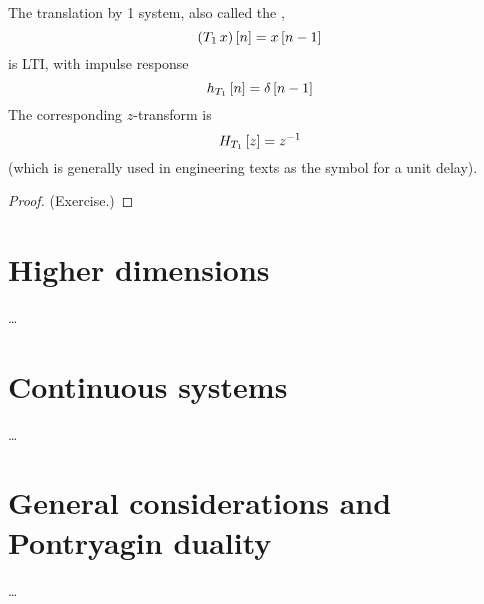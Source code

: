 \begin{example}
The translation by 1 system, also called the ,
\[ \left(T_1\,x\right)\left[ n \right] = x\left[ n-1 \right] \]
is LTI, with impulse response
\[ h_{T_1}\left[ n \right] = \delta\left[ n-1 \right] \]
The corresponding $z$-transform is
\[ H_{T_1}\left[ z \right] = z^{-1} \]
(which is generally used in engineering texts as the symbol for a unit delay).
\end{example}
\begin{proof}
(Exercise.)
\end{proof}

\section{Higher dimensions}

\ldots

\section{Continuous systems}

\ldots

\section{General considerations and Pontryagin duality}

\ldots